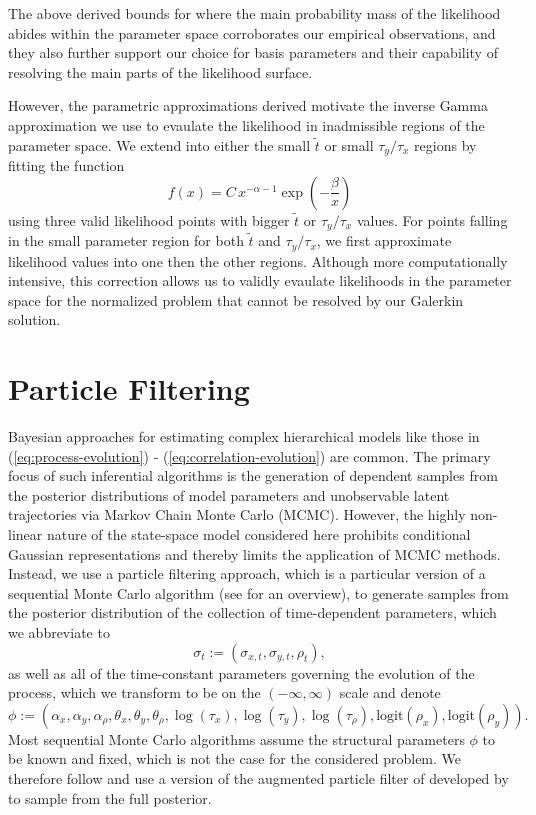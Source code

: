 \documentclass[10pt]{article}
\begin{document}
\begin{enumerate}
      The above derived bounds for where the main probability mass of
      the likelihood abides within the parameter space corroborates
      our empirical observations, and they also further support our
      choice for basis parameters and their capability of resolving
      the main parts of the likelihood surface.

      However, the parametric approximations derived motivate the
      inverse Gamma approximation we use to evaulate the likelihood in
      inadmissible regions of the parameter space. We extend into
      either the small $\tilde{t}$ or small $\tau_y/\tau_x$ regions by
      fitting the function
      \[
        f(x) = C\, x^{-\alpha-1} \exp\left( -\frac{\beta}{x} \right)
      \]
      using three valid likelihood points with bigger $\tilde{t}$ or
      $\tau_y/\tau_x$ values. For points falling in the small
      parameter region for both $\tilde{t}$ and $\tau_y/\tau_x$, we
      first approximate likelihood values into one then the other
      regions. Although more computationally intensive, this
      correction allows us to validly evaulate likelihoods in the
      parameter space for the normalized problem that cannot be
      resolved by our Galerkin solution.
\end{enumerate}


\section{Particle Filtering}
Bayesian approaches for estimating complex hierarchical models like
those in (\ref{eq:process-evolution}) -
(\ref{eq:correlation-evolution}) are common. The primary focus of such
inferential algorithms is the generation of dependent samples from the
posterior distributions of model parameters and unobservable latent
trajectories via Markov Chain Monte Carlo (MCMC). However, the highly
non-linear nature of the state-space model considered here prohibits
conditional Gaussian representations and thereby limits the
application of MCMC methods. Instead, we use a particle filtering
approach, which is a particular version of a sequential Monte Carlo
algorithm (see \cite{doucet2001sequential} for an overview), to
generate samples from the posterior distribution of the collection of
time-dependent parameters, which we abbreviate to
\[
  \sigma_t := (\sigma_{x,t}, \sigma_{y,t}, \rho_t),
\]
as well as all of the time-constant parameters governing the evolution
of the process, which we transform to be on the $(-\infty, \infty)$
scale and denote
\[
  \phi := (\alpha_x, \alpha_y, \alpha_\rho, \theta_x, \theta_y,
  \theta_\rho, \log(\tau_x), \log(\tau_y), \log(\tau_\rho),
  \mbox{logit}(\rho_x), \mbox{logit}(\rho_y)).
\]
Most sequential Monte Carlo algorithms assume the structural
parameters $\phi$ to be known and fixed, which is not the case for the
considered problem. We therefore follow \cite{rodriguez2012} and use a
version of the augmented particle filter of \cite{pitt1999filtering}
developed by \cite{liu2001combined} to sample from the full
posterior.
\end{document}
